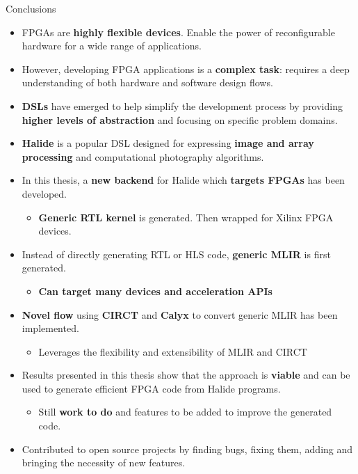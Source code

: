 \documentclass[8pt,a4paper,oneside,hidelinks,aspectratio=169,dvipsnames]{beamer}
\begin{document}
\begin{frame}{Conclusions}
  \begin{itemize}
    \item FPGAs are \textbf{highly flexible devices}. Enable the power of reconfigurable hardware for a wide range of applications.
    \item However, developing FPGA applications is a \textbf{complex task}: requires a deep understanding of both hardware and software design flows.
    \item \textbf{DSLs} have emerged to help simplify the development process by providing \textbf{higher levels of abstraction} and focusing on specific problem domains.
    \item \textbf{Halide} is a popular DSL designed for expressing \textbf{image and array processing} and computational photography algorithms.
    \item In this thesis, a \textbf{new backend} for Halide which \textbf{targets FPGAs} has been developed.
          \begin{itemize}
            \item \textbf{Generic RTL kernel} is generated. Then wrapped for Xilinx FPGA devices.
          \end{itemize}
    \item Instead of directly generating RTL or HLS code, \textbf{generic MLIR} is first generated.
          \begin{itemize}
            \item \textbf{Can target many devices and acceleration APIs}
          \end{itemize}
    \item \textbf{Novel flow} using \textbf{CIRCT} and \textbf{Calyx} to convert generic MLIR has been implemented.
          \begin{itemize}
            \item Leverages the flexibility and extensibility of MLIR and CIRCT
          \end{itemize}
    \item Results presented in this thesis show that the approach is \textbf{viable} and can be used to generate efficient FPGA code from Halide programs.
          \begin{itemize}
            \item Still \textbf{work to do} and features to be added to improve the generated code.
          \end{itemize}
    \item Contributed to open source projects by finding bugs, fixing them, adding
    and bringing the necessity of new features.
  \end{itemize}
\end{frame}
\end{document}
